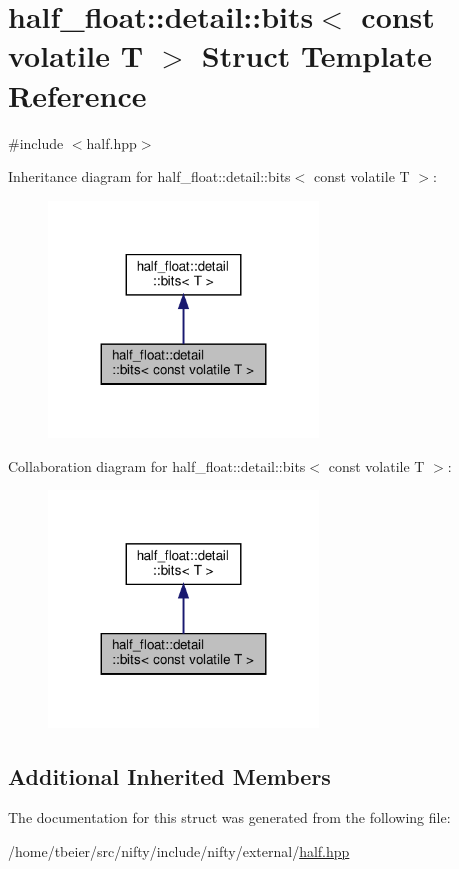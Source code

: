 \hypertarget{structhalf__float_1_1detail_1_1bits_3_01const_01volatile_01T_01_4}{}\section{half\+\_\+float\+:\+:detail\+:\+:bits$<$ const volatile T $>$ Struct Template Reference}
\label{structhalf__float_1_1detail_1_1bits_3_01const_01volatile_01T_01_4}


{\ttfamily \#include $<$half.\+hpp$>$}



Inheritance diagram for half\+\_\+float\+:\+:detail\+:\+:bits$<$ const volatile T $>$\+:
\nopagebreak
\begin{figure}[H]
\begin{center}
\leavevmode
\includegraphics[width=203pt]{structhalf__float_1_1detail_1_1bits_3_01const_01volatile_01T_01_4__inherit__graph}
\end{center}
\end{figure}


Collaboration diagram for half\+\_\+float\+:\+:detail\+:\+:bits$<$ const volatile T $>$\+:
\nopagebreak
\begin{figure}[H]
\begin{center}
\leavevmode
\includegraphics[width=203pt]{structhalf__float_1_1detail_1_1bits_3_01const_01volatile_01T_01_4__coll__graph}
\end{center}
\end{figure}
\subsection*{Additional Inherited Members}


The documentation for this struct was generated from the following file\+:\begin{DoxyCompactItemize}
\item 
/home/tbeier/src/nifty/include/nifty/external/\hyperlink{half_8hpp}{half.\+hpp}\end{DoxyCompactItemize}
